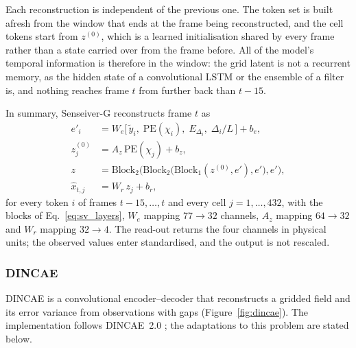 \documentclass[english, 12pt, a4paper, elec, utf8, a-2b, online]{aaltothesis}
\begin{document}
Each reconstruction is independent of the previous one. The token set is built
afresh from the window that ends at the frame being reconstructed, and the cell
tokens start from $z^{(0)}$, which is a learned initialisation shared by every
frame rather than a state carried over from the frame before. All of the
model's temporal information is therefore in the window: the grid latent is not
a recurrent memory, as the hidden state of a convolutional LSTM or the ensemble
of a filter is, and nothing reaches frame $t$ from further back than
$t - 15$.

In summary, Senseiver\nobreakdash-G reconstructs frame $t$ as
\begin{equation}
	\begin{aligned}
	e'_i &= W_e \big[\, \tilde{y}_i,\; \mathrm{PE}(\chi_i),\; E_{\Delta_i},\; \Delta_i / L \,\big] + b_e, \\
	z^{(0)}_j &= A_z\, \mathrm{PE}(\chi_j) + b_z, \\
	z &= \mathrm{Block}_2\big(\mathrm{Block}_2\big(\mathrm{Block}_1(z^{(0)}, e'), e'\big), e'\big), \\
	\hat{x}_{t,j} &= W_r\, z_j + b_r,
	\end{aligned}
	\label{eq:sv_g}
\end{equation}
for every token $i$ of frames $t-15, \dots, t$ and every cell $j = 1, \dots, 432$,
with the blocks of Eq.~\eqref{eq:sv_layers}, $W_e$ mapping
$77 \to 32$ channels, $A_z$ mapping $64 \to 32$ and $W_r$ mapping $32 \to 4$.
The read-out returns the four channels in physical units; the observed values
enter standardised, and the output is not rescaled.

\subsubsection{DINCAE}
\label{sec:dincae}

DINCAE \cite{barth2020dincae1, barth2022dincae2} is a convolutional
encoder--decoder that reconstructs a gridded field and its error variance from
observations with gaps (Figure~\ref{fig:dincae}). The implementation follows
DINCAE~2.0 \cite{barth2022dincae2}; the adaptations to this problem are stated
below.
\end{document}
